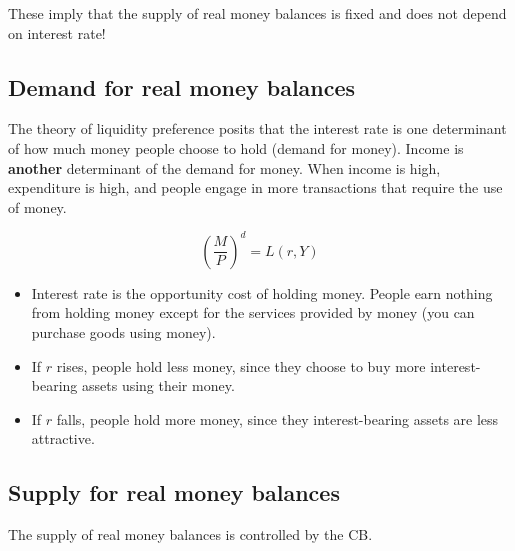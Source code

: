 \documentclass[10pt]{article}
\begin{document}
These imply that the supply of real money balances is fixed and does not depend on
interest rate!

\begin{figure}[H]
\end{figure}




\subsection{Demand for real money balances}
The theory of liquidity preference posits that the interest rate is one determinant of
how much money people choose to hold (demand for money).
Income is {\textbf {another}} determinant of the demand for money.
When income is high, expenditure is high, and people engage in more transactions that
require the use of money.

\begin{equation*}
\left( \frac{M}{P} \right) ^{d} = L(r, Y)
\end{equation*}


\begin{itemize}
\item Interest rate is the opportunity cost of holding money. People earn nothing from
		holding money except for the services provided by money (you can purchase goods using
		money).
\item If $ r $ rises, people hold less money, since they choose to buy more interest-
		bearing assets using their money.
\item If $ r $ falls, people hold more money, since they  interest-bearing assets are
		less attractive.
\end{itemize}




\subsection{Supply for real money balances}
The supply of real money balances is controlled by the CB.
\end{document}
